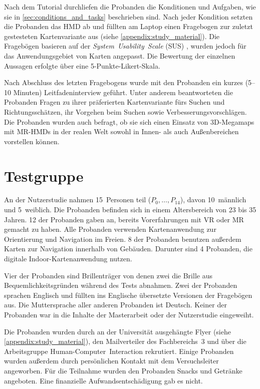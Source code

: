 Nach dem Tutorial durchliefen die Probanden die Konditionen und Aufgaben, wie sie in \autoref{sec:conditions_and_tasks} beschrieben sind.
Nach jeder Kondition setzten die Probanden das HMD ab und füllten am Laptop einen Fragebogen zur zuletzt gestesteten Kartenvariante aus (siehe \autoref{appendix:study_material}).
Die Fragebögen basieren auf der \emph{System~Usability~Scale} (SUS) \autocite{Brooke2013}, wurden jedoch für das Anwendungsgebiet von Karten angepasst.
Die Bewertung der einzelnen Aussagen erfolgte über eine 5-Punkte-Likert-Skala.

Nach Abschluss des letzten Fragebogens wurde mit den Probanden ein kurzes (5--10 Minuten) Leitfadeninterview geführt.
Unter anderem beantworteten die Probanden Fragen zu ihrer präferierten Kartenvariante fürs Suchen und Richtungsschätzen, ihr Vorgehen beim Suchen sowie Verbesserungsvorschlägen.
Die Probanden wurden auch befragt, ob sie sich einen Einsatz von 3D-Megamaps mit MR-HMDs in der realen Welt sowohl in Innen- als auch Außenbereichen vorstellen können.

\section{Testgruppe}
An der Nutzerstudie nahmen 15~Personen teil ($P_0, \dots, P_{14}$), davon 10~männlich und 5~weiblich.
Die Probanden befinden sich in einem Altersbereich von 23 bis 35 Jahren.
12 der Probanden gaben an, bereits Vorerfahrungen mit VR oder MR gemacht zu haben.
Alle Probanden verwenden Kartenanwendung zur Orientierung und Navigation im Freien.
8 der Probanden benutzen außerdem Karten zur Navigation innerhalb von Gebäuden.
Darunter sind 4 Probanden, die digitale Indoor-Kartenanwendung nutzen.

Vier der Probanden sind Brillenträger von denen zwei die Brille aus Bequemlichkeitsgründen während des Tests abnahmen.
Zwei der Probanden sprachen Englisch und füllten ins Englische übersetzte Versionen der Fragebögen aus.
Die Muttersprache aller anderen Probanden ist Deutsch.
Keiner der Probanden war in die Inhalte der Masterarbeit oder der Nutzerstudie eingeweiht.

Die Probanden wurden durch an der Universität ausgehängte Flyer (siehe \autoref{appendix:study_material}), den Mailverteiler des Fachbereichs~3 und über die Arbeitsgruppe Human-Computer~Interaction rekrutiert.
Einige Probanden wurden außerdem durch persönlichen Kontakt mit dem Versuchsleiter angeworben.
Für die Teilnahme wurden den Probanden Snacks und Getränke angeboten.
Eine finanzielle Aufwandsentschädigung gab es nicht.

